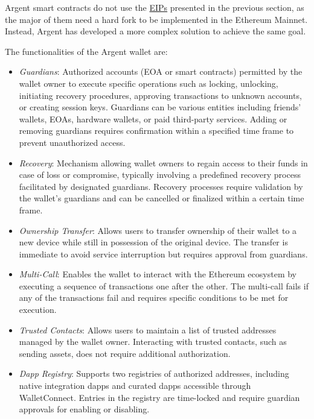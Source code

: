 
Argent smart contracts do not use the \hyperref[subsec:eips]{EIPs} presented in the previous section, as the major of them need a hard fork to be implemented in the Ethereum Mainnet. Instead, Argent has developed a more complex solution to achieve the same goal. 


The functionalities of the Argent wallet are: \cite{argent-smart-wallet-specifications}
\begin{itemize}
    \item \textit{Guardians}: Authorized accounts (EOA or smart contracts) permitted by the wallet owner to execute specific operations such as locking, unlocking, initiating recovery procedures, approving transactions to unknown accounts, or creating session keys. Guardians can be various entities including friends' wallets, EOAs, hardware wallets, or paid third-party services. Adding or removing guardians requires confirmation within a specified time frame to prevent unauthorized access.
    \item \textit{Recovery}: Mechanism allowing wallet owners to regain access to their funds in case of loss or compromise, typically involving a predefined recovery process facilitated by designated guardians. Recovery processes require validation by the wallet's guardians and can be cancelled or finalized within a certain time frame.
    \item \textit{Ownership Transfer}: Allows users to transfer ownership of their wallet to a new device while still in possession of the original device. The transfer is immediate to avoid service interruption but requires approval from guardians.
    \item \textit{Multi-Call}: Enables the wallet to interact with the Ethereum ecosystem by executing a sequence of transactions one after the other. The multi-call fails if any of the transactions fail and requires specific conditions to be met for execution.
    \item \textit{Trusted Contacts}: Allows users to maintain a list of trusted addresses managed by the wallet owner. Interacting with trusted contacts, such as sending assets, does not require additional authorization.
    \item \textit{Dapp Registry}: Supports two registries of authorized addresses, including native integration dapps and curated dapps accessible through WalletConnect. Entries in the registry are time-locked and require guardian approvals for enabling or disabling.

\end{itemize}
